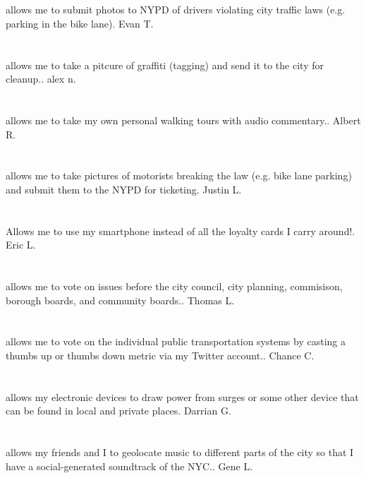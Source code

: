 \section{}allows me to submit photos to NYPD of drivers violating city traffic laws (e.g. parking in the bike lane). Evan T.
\section{}allows me to take a pitcure of graffiti (tagging) and send it to the city for cleanup.. alex n.
\section{}allows me to take my own personal walking tours with audio commentary.. Albert R.
\section{}allows me to take pictures of motorists breaking the law (e.g. bike lane parking) and submit them to the NYPD for ticketing. Justin L.
\section{}Allows me to use my smartphone instead of all the loyalty cards I carry around!. Eric L.
\section{}allows me to vote on issues before the city council,  city planning,  commisison,  borough boards,  and community boards.. Thomas L.
\section{}allows me to vote on the individual public transportation systems by casting a thumbs up or thumbs down metric via my Twitter account.. Chance C.
\section{}allows my electronic devices to draw power from surges or some other device that can be found in local and private places. Darrian G.
\section{}allows my friends and I to geolocate music to different parts of the city so that I have a social-generated soundtrack of the NYC.. Gene L.
